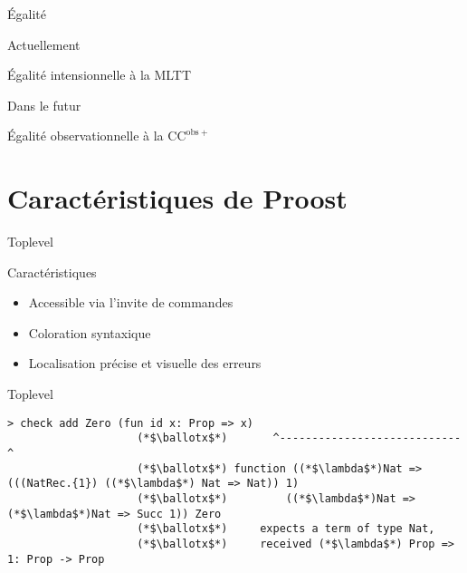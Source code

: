 \documentclass[12pt, aspectratio=169]{beamer}
\begin{document}
        \begin{frame}{Égalité}

            \begin{block}{Actuellement}

                Égalité intensionnelle à la MLTT

            \end{block}

            \vfill
            \pause

            \begin{alertblock}{Dans le futur}

                Égalité observationnelle à la $\mathrm{CC}^{\mathrm{obs}+}$

            \end{alertblock}

        \end{frame}

    \section{Caractéristiques de Proost}

        \begin{frame}[fragile]{Toplevel}

            \begin{block}{Caractéristiques}

                \begin{itemize}
                    \item Accessible via l'invite de commandes \pause
                    \item Coloration syntaxique \pause
                    \item Localisation précise et visuelle des erreurs
                \end{itemize}

            \end{block} \pause

            \begin{block}{Toplevel}

                \begin{lstlisting}[language=mdln]
                    > check add Zero (fun id x: Prop => x)
                    (*$\ballotx$*)       ^----------------------------^
                    (*$\ballotx$*) function ((*$\lambda$*)Nat => (((NatRec.{1}) ((*$\lambda$*) Nat => Nat)) 1)
                    (*$\ballotx$*)         ((*$\lambda$*)Nat => (*$\lambda$*)Nat => Succ 1)) Zero
                    (*$\ballotx$*)     expects a term of type Nat,
                    (*$\ballotx$*)     received (*$\lambda$*) Prop => 1: Prop -> Prop
                \end{lstlisting}

            \end{block}

        \end{frame}
\end{document}
